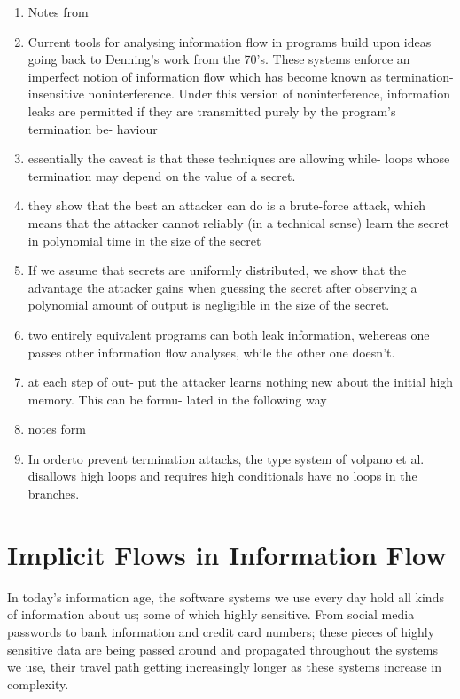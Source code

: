 \documentclass[11pt,letterpaper]{article}
\begin{document}
\begin{enumerate}
\item Notes from \cite{askarov2008termination}

\item Current tools for analysing information flow in programs build upon ideas going back to Denning’s work from the 70’s. These systems enforce an imperfect notion of information flow which has become known as termination- insensitive noninterference. Under this version of noninterference, information leaks are permitted if they are transmitted purely by the program’s termination be- haviour

\item essentially the caveat is that these techniques are allowing while- loops whose termination may depend on the value of a secret.

\item they show that the best an attacker can do is a brute-force attack, which means that the attacker cannot reliably (in a technical sense) learn the secret in polynomial time in the size of the secret

\item If we assume that secrets are uniformly distributed, we show that the advantage the attacker gains when guessing the secret after observing a polynomial amount of output is negligible in the size of the secret.

\item two entirely equivalent programs can both leak information, wehereas one passes other information flow analyses, while the other one doesn't.

\item at each step of out- put the attacker learns nothing new about the initial high memory. This can be formu- lated in the following way

\item notes form \cite{volpano1997eliminating}

\item In orderto prevent termination attacks, the type system of volpano et al. disallows high loops and requires high conditionals have no loops in the branches.

\end{enumerate}

\section*{Implicit Flows in Information Flow}
In today's information age, the software systems we use every day hold all kinds of information about us; some of which highly sensitive. From social media passwords to bank information and credit card numbers; these pieces of highly sensitive data are being passed around and propagated throughout the systems we use, their travel path getting increasingly longer as these systems increase in complexity.
\end{document}
